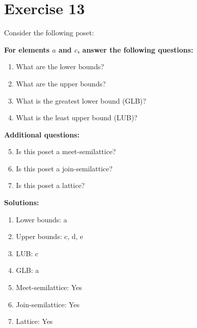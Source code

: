 \documentclass{article}
\begin{document}
\section*{Exercise 13}
Consider the following poset:
\begin{center}
\end{center}

    \textbf{For elements $a$ and $c$, answer the following questions:}
\begin{enumerate}
    \item What are the lower bounds?
    \item What are the upper bounds?
    \item What is the greatest lower bound (GLB)?
    \item What is the least upper bound (LUB)?
\end{enumerate}
    \hspace*{3ex} \textbf{Additional questions:}
\begin{enumerate}
    \setcounter{enumi}{4}
    \item Is this poset a meet-semilattice?
    \item Is this poset a join-semilattice?
    \item Is this poset a lattice?
\end{enumerate}

\textbf{Solutions:}
\begin{enumerate}
    \item Lower bounds: {a}
    \item Upper bounds: {c, d, e}
    \item LUB: c
    \item GLB: a
    \item Meet-semilattice: Yes
    \item Join-semilattice: Yes
    \item Lattice: Yes
\end{enumerate}
\newpage
\end{document}
